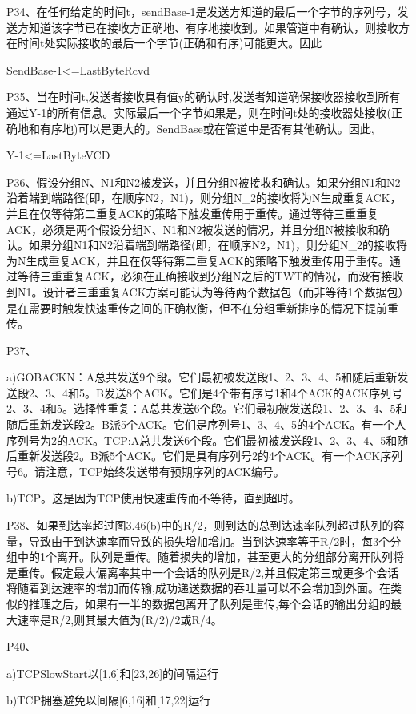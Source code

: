 \documentclass[11pt,UTF8,twoside]{article}
\begin{document}
	P34、在任何给定的时间t，sendBase-1是发送方知道的最后一个字节的序列号，发送方知道该字节已在接收方正确地、有序地接收到。如果管道中有确认，则接收方在时间t处实际接收的最后一个字节(正确和有序)可能更大。因此
	
	SendBase-1<=LastByteRcvd
	
	P35、当在时间t,发送者接收具有值y的确认时,发送者知道确保接收器接收到所有通过Y-1的所有信息。实际最后一个字节如果是，则在时间t处的接收器处接收(正确地和有序地)可以是更大的。SendBase或在管道中是否有其他确认。因此,
	
	Y-1<=LastByteVCD
	
	P36、假设分组N、N1和N2被发送，并且分组N被接收和确认。如果分组N1和N2沿着端到端路径(即，在顺序N2，N1)，则分组N_2的接收将为N生成重复ACK，并且在仅等待第二重复ACK的策略下触发重传用于重传。通过等待三重重复ACK，必须是两个假设分组N、N1和N2被发送的情况，并且分组N被接收和确认。如果分组N1和N2沿着端到端路径(即，在顺序N2，N1)，则分组N_2的接收将为N生成重复ACK，并且在仅等待第二重复ACK的策略下触发重传用于重传。通过等待三重重复ACK，必须在正确接收到分组N之后的TWT的情况，而没有接收到N1。设计者三重重复ACK方案可能认为等待两个数据包（而非等待1个数据包）是在需要时触发快速重传之间的正确权衡，但不在分组重新排序的情况下提前重传。
	
	P37、
	
	a)GOBACKN：A总共发送9个段。它们最初被发送段1、2、3、4、5和随后重新发送段2、3、4和5。B发送8个ACK。它们是4个带有序号1和4个ACK的ACK序列号2、3、4和5。选择性重复：A总共发送6个段。它们最初被发送段1、2、3、4、5和随后重新发送段2。B派5个ACK。它们是序列号1、3、4、5的4个ACK。有一个人序列号为2的ACK。TCP:A总共发送6个段。它们最初被发送段1、2、3、4、5和随后重新发送段2。B派5个ACK。它们是具有序列号2的4个ACK。有一个ACK序列号6。请注意，TCP始终发送带有预期序列的ACK编号。
	
	b)TCP。这是因为TCP使用快速重传而不等待，直到超时。
	
	P38、如果到达率超过图3.46(b)中的R/2，则到达的总到达速率队列超过队列的容量，导致由于到达速率而导致的损失增加增加。当到达速率等于R/2时，每3个分组中的1个离开。队列是重传。随着损失的增加，甚至更大的分组部分离开队列将是重传。假定最大偏离率其中一个会话的队列是R/2,并且假定第三或更多个会话将随着到达速率的增加而传输,成功递送数据的吞吐量可以不会增加到外面。在类似的推理之后，如果有一半的数据包离开了队列是重传,每个会话的输出分组的最大速率是R/2,则其最大值为(R/2)/2或R/4。
	
	P40、
	
	a)TCPSlowStart以[1,6]和[23,26]的间隔运行
	
	b)TCP拥塞避免以间隔[6,16]和[17,22]运行
	
\end{document}
